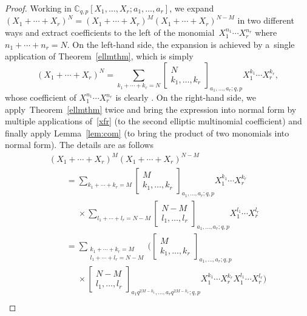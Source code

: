 \documentclass[10pt,a4paper]{amsart}
\numberwithin{equation}{section}
\theoremstyle{definition}
\newcommand{\C}{\mathbb C}
\begin{document}
\begin{proof}
 Working in $\C_{q,p}[X_1,\dots,X_r;a_1,\dots,a_r]$,
 we expand
$(X_1+\cdots+X_r)^N=(X_1+\cdots+X_r)^M(X_1+\cdots+X_r)^{N-M}$
in two different ways and extract coefficients to the left of the monomial~${X_1^{n_1}\cdots X_r^{n_r}}$ where $n_1+\cdots+n_r=N$.
On the left-hand side, the expansion is achieved by a~single application
of Theorem~\ref{ellmthm}, which is simply
\[
(X_1+\cdots+X_r)^N=
\sum_{k_1+\cdots+k_r=N}
\begin{bmatrix}N\\k_1,\dots,k_r\end{bmatrix}_{a_1,\dots,a_r;q,p}
X_1^{k_1}\cdots X_r^{k_r},
\]
whose coefficient of $X_1^{n_1}\cdots X_r^{n_r}$ is clearly
.
On the right-hand side, we apply~Theorem~\ref{ellmthm} twice
and bring the expression into normal form by multiple applications
of~\eqref{xfr} (to the second elliptic multinomial coefficient)
and finally apply Lemma~\ref{lem:com} (to bring the product of
two monomials into normal form). The details are as follows
\begin{gather*}
(X_1+\cdots+X_r)^M(X_1+\cdots+X_r)^{N-M}\\
\qquad=\sum_{k_1+\cdots+k_r=M}
\begin{bmatrix}M\\k_1,\dots,k_r\end{bmatrix}_{a_1,\dots,a_r;q,p}
X_1^{k_1}\cdots X_r^{k_r}\\
\phantom{\qquad=}{}\times\sum_{l_1+\cdots+l_r=N-M}
\begin{bmatrix}N-M\\l_1,\dots,l_r\end{bmatrix}_{a_1,\dots,a_r;q,p}
X_1^{l_1}\cdots X_r^{l_r}\\
\qquad=\sum_{\substack{k_1+\cdots+k_r=M\\l_1+\cdots+l_r=N-M}}
\biggl(\begin{bmatrix}M\\k_1,\dots,k_r\end{bmatrix}_{a_1,\dots,a_r;q,p}\\
\phantom{\qquad=}{}\times
\begin{bmatrix}N-M\\l_1,\dots,l_r\end{bmatrix}_{a_1q^{2M-k_1},\dots,a_rq^{2M-k_r};q,p}
X_1^{k_1}\cdots X_r^{k_r}X_1^{l_1}\cdots X_r^{l_r}\biggr)\\

\end{gather*}
\end{proof}
\end{document}
